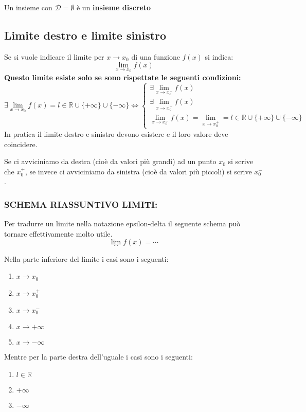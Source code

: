 Un insieme con $\mathcal{D} = \emptyset $ è un \textbf{insieme discreto}

\subsection{Limite destro e limite sinistro}
Se si vuole indicare il limite per $x \to x_0$ di una funzione $f(x)$ si indica:
\begin{equation*}
	\lim_{x \to x_0} f(x)
\end{equation*}
\textbf{Questo limite esiste solo se sono rispettate le seguenti condizioni:}
\begin{equation*}
	\exists \lim_{x \to x_0} f(x) = l \in \mathbb{R} \cup \{+\infty\} \cup \{-\infty\}\iff 
	\begin{cases*}
		\exists \lim_{x \to x_o^-} f(x)\\
		\exists \lim_{x \to x_o^+} f(x)\\
		\lim_{x \to x_0^-} f(x) = \lim_{x \to x_0^+} = l \in \mathbb{R} \cup \{+\infty\} \cup \{-\infty\}
	\end{cases*}
\end{equation*}
In pratica il limite destro e sinistro devono esistere e il loro valore deve coincidere.

Se ci avviciniamo da destra (cioè da valori più grandi) ad un punto $x_0$ si scrive che $x_0^+$, se invece ci avviciniamo da sinistra (cioè da valori più piccoli) si scrive $x_0^-$.

\subsubsection{SCHEMA RIASSUNTIVO LIMITI:} 
Per tradurre un limite nella notazione epsilon-delta il seguente schema può tornare effettivamente molto utile.
\begin{equation*}
	\lim_{\cdots} f(x) = \cdots
\end{equation*}

Nella parte inferiore del limite i casi sono i seguenti:
\begin{enumerate}[label=(\roman*)]
    \item $x\to x_0$
    \item $x\to x_0^+$
    \item $x\to x_0^-$
    \item $x\to +\infty$
    \item $x\to -\infty$
\end{enumerate}

Mentre per la parte destra dell'uguale i casi sono i seguenti:
\begin{enumerate}
    \item $l \in \mathbb{R}$
    \item $+ \infty$
    \item $- \infty$
\end{enumerate}

